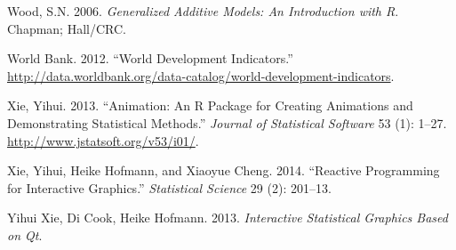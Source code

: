 \documentclass[12pt,]{isuthesis}
\begin{document}
\hypertarget{ref-mgcv}{}
Wood, S.N. 2006. \emph{Generalized Additive Models: An Introduction with
R}. Chapman; Hall/CRC.

\hypertarget{ref-WorldBank}{}
World Bank. 2012. ``World Development Indicators.''
\url{http://data.worldbank.org/data-catalog/world-development-indicators}.

\hypertarget{ref-animation}{}
Xie, Yihui. 2013. ``Animation: An R Package for Creating Animations and
Demonstrating Statistical Methods.'' \emph{Journal of Statistical
Software} 53 (1): 1--27. \url{http://www.jstatsoft.org/v53/i01/}.

\hypertarget{ref-Xie:2014co}{}
Xie, Yihui, Heike Hofmann, and Xiaoyue Cheng. 2014. ``Reactive
Programming for Interactive Graphics.'' \emph{Statistical Science} 29
(2): 201--13.

\hypertarget{ref-cranvas}{}
Yihui Xie, Di Cook, Heike Hofmann. 2013. \emph{Interactive Statistical
Graphics Based on Qt}.



\end{document}
